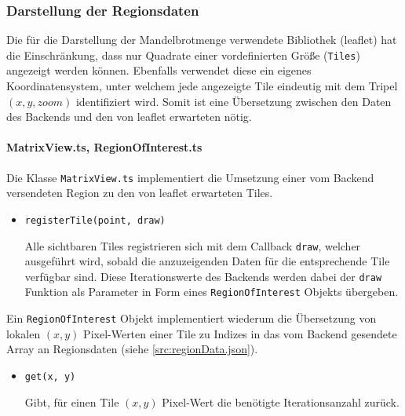 \subsubsection{Darstellung der Regionsdaten} %

Die für die Darstellung der Mandelbrotmenge verwendete Bibliothek (leaflet) hat die Einschränkung, dass
nur Quadrate einer vordefinierten Größe (\verb|Tiles|) angezeigt werden können. Ebenfalls verwendet diese ein
eigenes Koordinatensystem, unter welchem jede angezeigte Tile eindeutig mit dem Tripel \( (x, y, zoom) \)
identifiziert wird. Somit ist eine Übersetzung zwischen den Daten des Backends und den von leaflet erwarteten nötig.

\paragraph{MatrixView.ts, RegionOfInterest.ts}\label{par:matrixView}
Die Klasse \verb|MatrixView.ts| implementiert die Umsetzung einer vom Backend versendeten Region zu
den von leaflet erwarteten Tiles.
\begin{itemize}
	\item \verb|registerTile(point, draw)|

	      Alle sichtbaren Tiles registrieren sich mit dem Callback \verb|draw|,
	      welcher ausgeführt wird, sobald die anzuzeigenden Daten für die
	      entsprechende Tile verfügbar sind. Diese Iterationswerte des Backends werden dabei der \verb|draw| Funktion als Parameter
	      in Form eines \verb|RegionOfInterest| Objekts übergeben.
\end{itemize}


Ein \verb|RegionOfInterest| Objekt implementiert wiederum die Übersetzung von lokalen \( (x,y) \) Pixel-Werten
einer Tile zu Indizes in das vom Backend gesendete Array an Regionsdaten (siehe \autoref{src:regionData.json}).
\begin{itemize}
	\item \verb|get(x, y)|

	      Gibt, für einen Tile \( (x,y) \) Pixel-Wert die benötigte Iterationsanzahl zurück.
\end{itemize}


